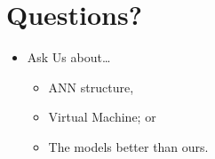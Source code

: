 \hypertarget{questions}{%
\section{Questions?}\label{questions}}

\begin{itemize}
\item
  Ask Us about\ldots{}

  \begin{itemize}
  \item
    ANN structure,
  \item
    Virtual Machine; or
  \item
    The models better than ours.
  \end{itemize}
\end{itemize}
